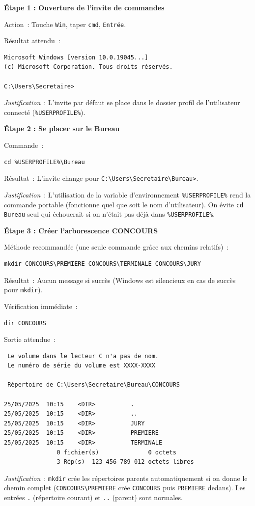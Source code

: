 \documentclass[11pt]{article}
\newcounter{popsec}
\newcounter{popsub}
\newcommand{\courssub}[1]{%
  \stepcounter{popsub}%
  \par\vspace{9pt}\noindent{\popxbold\fontsize{11.5}{13}\selectfont\color{popink}{\color{poporange}\thepopsec.\thepopsub}\hspace{6pt}#1}\par\nopagebreak\vspace{4pt}
}
\begin{document}
\courssub{Démarche et corrigé commenté}
\begin{exoresolu}
\noindent
\textbf{Étape 1 : Ouverture de l'invite de commandes}\par
\noindent
Action~: Touche \texttt{Win}, taper \texttt{cmd}, \texttt{Entrée}.\par
\noindent
Résultat attendu~:
\begin{lstlisting}
Microsoft Windows [version 10.0.19045...]
(c) Microsoft Corporation. Tous droits réservés.

C:\Users\Secretaire>
\end{lstlisting}
\noindent
\emph{Justification}~: L'invite par défaut se place dans le dossier profil de l'utilisateur connecté (\texttt{\%USERPROFILE\%}).

\textbf{Étape 2 : Se placer sur le Bureau}\par
\noindent
Commande~:
\begin{lstlisting}
cd %USERPROFILE%\Bureau
\end{lstlisting}
\noindent
Résultat~: L'invite change pour \texttt{C:\textbackslash Users\textbackslash Secretaire\textbackslash Bureau>}.\par
\noindent
\emph{Justification}~: L'utilisation de la variable d'environnement \texttt{\%USERPROFILE\%} rend la commande portable (fonctionne quel que soit le nom d'utilisateur). On évite \texttt{cd Bureau} seul qui échouerait si on n'était pas déjà dans \texttt{\%USERPROFILE\%}.

\textbf{Étape 3 : Créer l'arborescence CONCOURS}\par
\noindent
Méthode recommandée (une seule commande grâce aux chemins relatifs)~:
\begin{lstlisting}
mkdir CONCOURS\PREMIERE CONCOURS\TERMINALE CONCOURS\JURY
\end{lstlisting}
\noindent
Résultat~: Aucun message si succès (Windows est silencieux en cas de succès pour \texttt{mkdir}).\par
\noindent
Vérification immédiate~:
\begin{lstlisting}
dir CONCOURS
\end{lstlisting}
\noindent
Sortie attendue~:
\begin{lstlisting}
 Le volume dans le lecteur C n'a pas de nom.
 Le numéro de série du volume est XXXX-XXXX

 Répertoire de C:\Users\Secretaire\Bureau\CONCOURS

25/05/2025  10:15    <DIR>          .
25/05/2025  10:15    <DIR>          ..
25/05/2025  10:15    <DIR>          JURY
25/05/2025  10:15    <DIR>          PREMIERE
25/05/2025  10:15    <DIR>          TERMINALE
               0 fichier(s)              0 octets
               3 Rép(s)  123 456 789 012 octets libres
\end{lstlisting}
\noindent
\emph{Justification}~: \texttt{mkdir} crée les répertoires parents automatiquement si on donne le chemin complet (\texttt{CONCOURS\textbackslash PREMIERE} crée \texttt{CONCOURS} puis \texttt{PREMIERE} dedans). Les entrées \texttt{.} (répertoire courant) et \texttt{..} (parent) sont normales.


\end{exoresolu}
\end{document}
